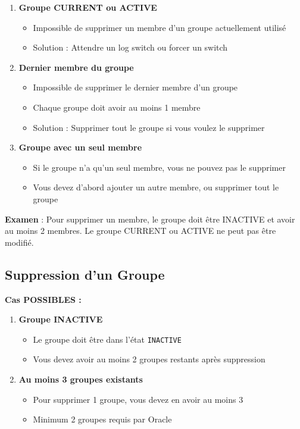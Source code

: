 \documentclass[11pt,a4paper]{article}
\begin{document}
\begin{enumerate}
    \item \textbf{Groupe CURRENT ou ACTIVE}
    \begin{itemize}
        \item Impossible de supprimer un membre d'un groupe actuellement utilisé
        \item Solution : Attendre un log switch ou forcer un switch
    \end{itemize}
    
    \item \textbf{Dernier membre du groupe}
    \begin{itemize}
        \item Impossible de supprimer le dernier membre d'un groupe
        \item Chaque groupe doit avoir au moins 1 membre
        \item Solution : Supprimer tout le groupe si vous voulez le supprimer
    \end{itemize}
    
    \item \textbf{Groupe avec un seul membre}
    \begin{itemize}
        \item Si le groupe n'a qu'un seul membre, vous ne pouvez pas le supprimer
        \item Vous devez d'abord ajouter un autre membre, ou supprimer tout le groupe
    \end{itemize}
\end{enumerate}

\begin{tipbox}
\textbf{Examen} : Pour supprimer un membre, le groupe doit être INACTIVE et avoir au moins 2 membres. Le groupe CURRENT ou ACTIVE ne peut pas être modifié.
\end{tipbox}

\subsection{Suppression d'un Groupe}

\textbf{Cas POSSIBLES :}

\begin{enumerate}
    \item \textbf{Groupe INACTIVE}
    \begin{itemize}
        \item Le groupe doit être dans l'état \texttt{INACTIVE}
        \item Vous devez avoir au moins 2 groupes restants après suppression
    \end{itemize}
    
    \item \textbf{Au moins 3 groupes existants}
    \begin{itemize}
        \item Pour supprimer 1 groupe, vous devez en avoir au moins 3
        \item Minimum 2 groupes requis par Oracle
    \end{itemize}
\end{enumerate}
\end{document}
